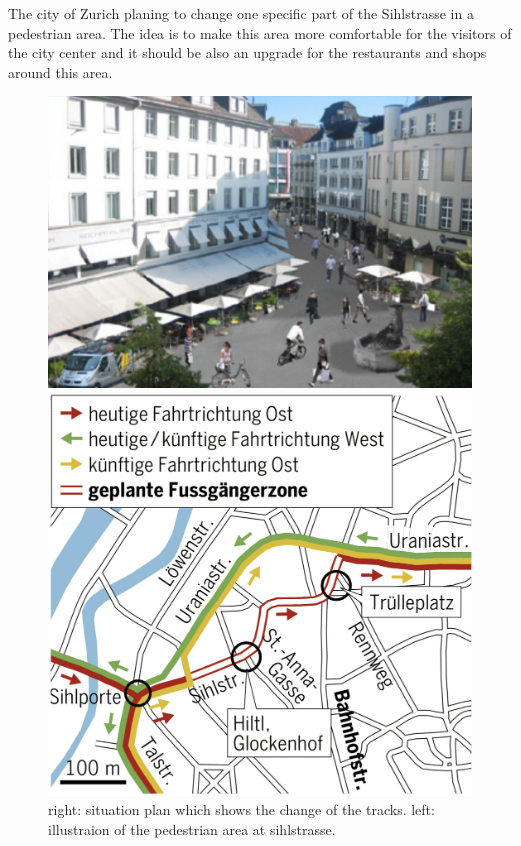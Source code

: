 \documentclass[11pt]{article}
\begin{document}
The city of Zurich planing to change one specific part of the Sihlstrasse in a pedestrian area. The idea is to make this area more comfortable for the visitors of the city center and it should be also an upgrade for the restaurants and shops around this area.
\begin{figure}[h]
\begin{minipage}[t]{.45\textwidth}
	\centering
	\vspace{30pt}
\includegraphics[width=\textwidth]{pedestrianarea.png}
\end{minipage}\hfill
\begin{minipage}[t]{.45\textwidth}
	\centering
	\vspace{0pt}
\includegraphics[width=\textwidth]{Plan_Sihlstrasse.png}
\end{minipage}\hfill
\caption{right: situation plan which shows the change of the tracks. left: illustraion of the pedestrian area at sihlstrasse.\cite{project}}
\end{figure}
\end{document}
